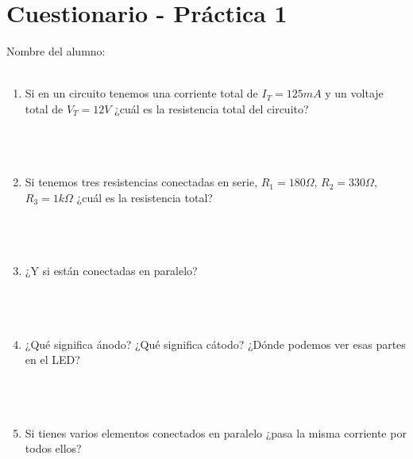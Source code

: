 \begin{center}
	\huge \textthing
\end{center}


\clearpage
\section{Cuestionario - Práctica 1}
	Nombre del alumno: \\[0.2cm]
	\horrule{0.5pt} \\[0.2cm] %

	\begin{enumerate}
		\item Si en un circuito tenemos una corriente total de $I_T = 125 mA$ y un voltaje total de $V_T = 12 V$ ¿cuál es la resistencia total del circuito? \\ \\ \\ \\
		\item Si tenemos tres resistencias conectadas en serie, $R_1 = 180 \Omega$, $R_2 = 330 \Omega$, $R_3 = 1 k \Omega$ ¿cuál es la resistencia total? \\ \\ \\ \\
		\item ¿Y si están conectadas en paralelo? \\ \\ \\ \\
		\item ¿Qué significa ánodo? ¿Qué significa cátodo? ¿Dónde podemos ver esas partes en el LED? \\ \\ \\ \\
		\item Si tienes varios elementos conectados en paralelo ¿pasa la misma corriente por todos ellos? \\
	\end{enumerate}


